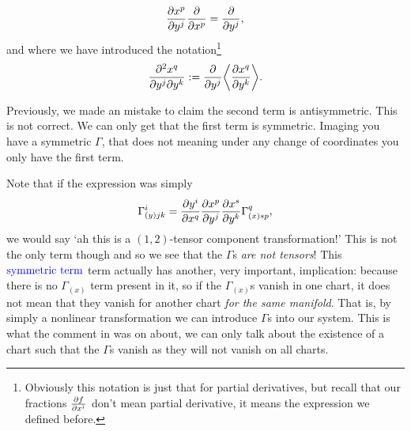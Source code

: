 \documentclass[12pt]{article} %
\begin{document}
\begin{align*} 
    \frac{\partial x^p}{\partial y^j}\frac{\partial}{\partial x^p} = \frac{\partial}{\partial y^j},
\end{align*} 
and where we have introduced the notation\footnote{Obviously this notation is just that for partial derivatives, but recall that our fractions $\frac{\partial f}{\partial x^i}$ don't mean partial derivative, it means the expression we defined before.} 
\begin{align*} 
    \frac{\partial^2 x^q}{\partial y^j\partial y^k} := \frac{\partial}{\partial y^j} \bigg\langle \frac{\partial x^q}{\partial y^k}\bigg\rangle.
\end{align*} 
\begin{rema}
Previously, we made an mistake to claim the second term is antisymmetric. This is not correct. We can only get that the first term is symmetric. Imaging you have a symmetric $\Gamma$, that does not meaning under any change of coordinates you only have the first term.
\end{rema}
\begin{rema}
 Note that if the expression was simply 
\begin{align*} 
    \Gamma^i_{(y)jk} = \frac{\partial y^i}{\partial x^q} \frac{\partial x^p}{\partial y^j}\frac{\partial x^s}{\partial y^k} \Gamma^{q}_{(x)sp},
\end{align*} 
we would say `ah this is a $(1,2)$-tensor component transformation!' This is not the only term though and so we see that the $\Gamma$s \textit{are not tensors}! This $\textcolor{blue}{\text{symmetric term}}$ term actually has another, very important, implication: because there is no $\Gamma_{(x)}$ term present in it, so if the $\Gamma_{(x)}$s vanish in one chart, it does not mean that they vanish for another chart \textit{for the same manifold}. That is, by simply a nonlinear transformation we can introduce $\Gamma$s into our system. This is what the comment in  was on about, we can only talk about the existence of a chart such that the $\Gamma$s vanish as they will not vanish on all charts.
\end{rema}
\end{document}
